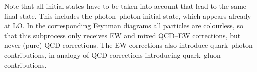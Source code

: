 Note that all initial states have to be taken into account that lead to the same final state.
This includes the photon--photon initial state, which appears already at LO.
In the corresponding Feynman diagrams all particles are colourless, so that this subprocess only receives EW and mixed QCD--EW corrections, but never (pure) QCD corrections.
The EW corrections also introduce quark--photon contributions, in analogy of QCD corrections introducing quark--gluon contributions.

%

